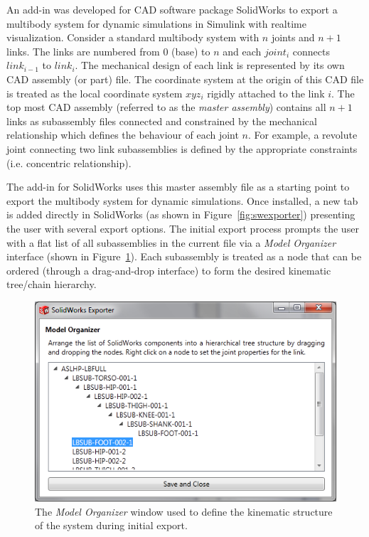 An add-in was developed for CAD software package SolidWorks to export a multibody system for dynamic simulations in Simulink with realtime visualization. Consider a standard multibody system with $n$ joints and $n + 1$ links. The links are numbered from 0 (base) to $n$ and each $joint_{i}$ connects $link_{i-1}$ to $link_{i}$. The mechanical design of each link is represented by its own CAD assembly (or part) file. The coordinate system at the origin of this CAD file is treated as the local coordinate system $xyz_{i}$ rigidly attached to the link $i$. The top most CAD assembly (referred to as the \emph{master assembly}) contains all $n + 1$ links as subassembly files connected and constrained by the mechanical relationship which defines the behaviour of each joint $n$. For example, a revolute joint connecting two link subassemblies is defined by the appropriate constraints (i.e. concentric relationship).

The add-in for SolidWorks uses this master assembly file as a starting point to export the multibody system for dynamic simulations. Once installed, a new tab is added directly in SolidWorks (as shown in Figure~\ref{fig:swexporter}) presenting the user with several export options. The initial export process prompts the user with a flat list of all subassemblies in the current file via a \emph{Model Organizer} interface (shown in Figure~\ref{fig:modelorg}). Each subassembly is treated as a node that can be ordered (through a drag-and-drop interface) to form the desired kinematic tree/chain hierarchy. 


\begin{figure}[!h]
	\centering
    \includegraphics[scale=1.0]{fig/ch3/modelorg.png}
  	\caption{The \emph{Model Organizer} window used to define the kinematic structure of the system during initial export.}
	\label{fig:modelorg}
\end{figure}

